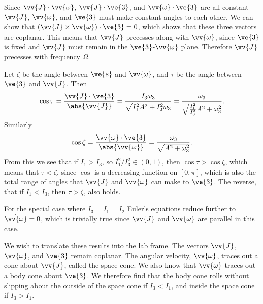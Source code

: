 \documentclass[fleqn]{NotesClass}
\begin{document}
    Since \(\vv{J}\cdot\vv{\omega}\), \(\vv{J}\cdot\ve{3}\), and \(\vv{\omega}\cdot\ve{3}\) are all constant \(\vv{J}\), \(\vv{\omega}\), and \(\ve{3}\) must make constant angles to each other.
    We can show that \((\vv{J} \times \vv{\omega}) \cdot \ve{3} = 0\), which shows that these three vectors are coplanar.
    This means that \(\vv{J}\) precesses along with \(\vv{\omega}\), since \(\ve{3}\) is fixed and \(\vv{J}\) must remain in the \(\ve{3}\)-\(\vv{\omega}\) plane.
    Therefore \(\vv{J}\) precesses with frequency \(\Omega\).
    
    Let \(\zeta\) be the angle between \(\ve{e}\) and \(\vv{\omega}\), and \(\tau\) be the angle between \(\ve{3}\) and \(\vv{J}\).
    Then
    \begin{equation}
        \cos \tau = \frac{\vv{J}\cdot\ve{3}}{\abs{\vv{J}}} = \frac{I_3\omega_3}{\sqrt{I_1^2A^2 + I_2^2\omega_3}} = \frac{\omega_3}{\sqrt{\frac{I_1^2}{I_3^2}A^2 + \omega_3^2}}.
    \end{equation}
    Similarly
    \begin{equation}
        \cos\zeta = \frac{\vv{\omega} \cdot \ve{3}}{\abs{\vv{\omega}}} = \frac{\omega_3}{\sqrt{A^2 + \omega_3^2}}.
    \end{equation}
    From this we see that if \(I_1 > I_3\), so \(I_1^2/I_3^2 \in (0, 1)\), then \(\cos\tau > \cos\zeta\), which means that \(\tau < \zeta\), since \(\cos\) is a decreasing function on \([0, \pi]\), which is also the total range of angles that \(\vv{J}\) and \(\vv{\omega}\) can make to \(\ve{3}\).
    The reverse, that if \(I_1 < I_3\), then \(\tau > \zeta\), also holds.
    
    For the special case where \(I_3 = I_1 = I_2\) Euler's equations reduce further to \(\dot{\vv{\omega}} = 0\), which is trivially true since \(\vv{J}\) and \(\vv{\omega}\) are parallel in this case.
    
    We wish to translate these results into the lab frame.
    The vectors \(\vv{J}\), \(\vv{\omega}\), and \(\ve{3}\) remain coplanar.
    The angular velocity, \(\vv{\omega}\), traces out a cone about \(\vv{J}\), called the space cone.
    We also know that \(\vv{\omega}\) traces out a body cone about \(\ve{3}\).
    We therefore find that the body cone rolls without slipping about the outside of the space cone if \(I_3 < I_1\), and inside the space cone if \(I_3 > I_1\).
    
\end{document}

